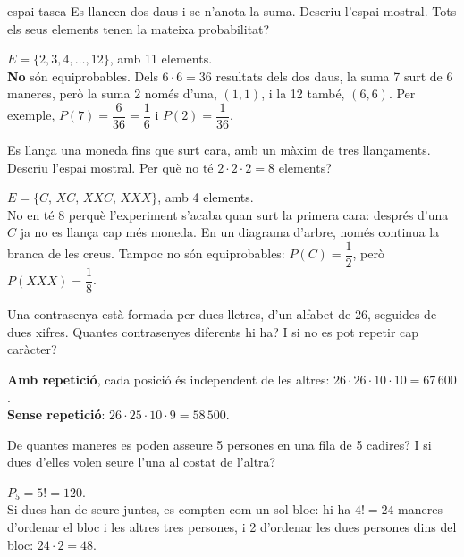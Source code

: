 \begin{apartats}

\begin{tria}{espai-tasca}
Es llancen dos daus i se n'anota la suma. Descriu l'espai mostral. Tots els seus elements tenen la
mateixa probabilitat?

\begin{solucio}
$E=\{2,3,4,\dots,12\}$, amb 11 elements.\\
\textbf{No} són equiprobables. Dels $6\cdot6=36$ resultats dels dos daus, la suma 7 surt de 6 maneres, però
la suma 2 només d'una, $(1,1)$, i la 12 també, $(6,6)$. Per exemple, $P(7)=\dfrac{6}{36}=\dfrac16$ i
$P(2)=\dfrac{1}{36}$.
\end{solucio}

Es llança una moneda fins que surt cara, amb un màxim de tres llançaments. Descriu l'espai mostral. Per
què no té $2\cdot2\cdot2=8$ elements?

\begin{solucio}
$E=\{C,\,XC,\,XXC,\,XXX\}$, amb 4 elements.\\
No en té 8 perquè l'experiment s'acaba quan surt la primera cara: després d'una $C$ ja no es llança cap
més moneda. En un diagrama d'arbre, només continua la branca de les creus. Tampoc no són equiprobables:
$P(C)=\dfrac12$, però $P(XXX)=\dfrac18$.
\end{solucio}
\end{tria}

Una contrasenya està formada per dues lletres, d'un alfabet de 26, seguides de dues xifres. Quantes
contrasenyes diferents hi ha? I si no es pot repetir cap caràcter?

\begin{solucio}
\textbf{Amb repetició}, cada posició és independent de les altres:
$26\cdot26\cdot10\cdot10=67\,600$.\\
\textbf{Sense repetició}: $26\cdot25\cdot10\cdot9=58\,500$.
\end{solucio}

\begin{nomesllarg}
De quantes maneres es poden asseure 5 persones en una fila de 5 cadires? I si dues d'elles volen seure
l'una al costat de l'altra?

\begin{solucio}
$P_5=5!=120$.\\
Si dues han de seure juntes, es compten com un sol bloc: hi ha $4!=24$ maneres d'ordenar el bloc i les
altres tres persones, i 2 d'ordenar les dues persones dins del bloc: $24\cdot2=48$.
\end{solucio}
\end{nomesllarg}

\end{apartats}
